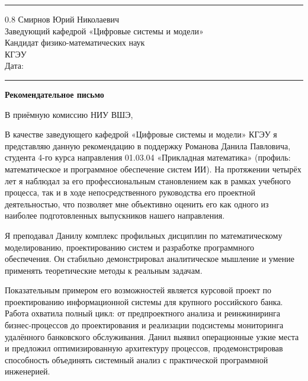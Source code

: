 \documentclass[a4paper,12pt]{article}
\begin{document}
\vspace{4pt}
\noindent\rule{\textwidth}{0.8pt}

\begin{flushright}
  \begin{spacing}{0.8}
    Смирнов Юрий Николаевич\\
    Заведующий кафедрой «Цифровые системы и модели»\\
    Кандидат физико-математических наук\\
    КГЭУ\\[6pt]
    Дата: \rule{4cm}{0.4pt}
  \end{spacing}
\end{flushright}

\begin{center}
  {\Large\bfseries Рекомендательное письмо}
\end{center}

В приёмную комиссию НИУ ВШЭ,

В качестве заведующего кафедрой «Цифровые системы и модели» КГЭУ я представляю данную рекомендацию в поддержку Романова Данила Павловича, студента 4-го курса направления 01.03.04 «Прикладная математика» (профиль: ма\-те\-ма\-ти\-че\-ское и про\-грамм\-ное обес\-пе\-че\-ние систем ИИ). На протяжении четырёх лет я наблюдал за его профессиональным становлением как в рамках учебного процесса, так и в ходе непосредственного руководства его проектной деятельностью, что позволяет мне объективно оценить его как одного из наиболее подготовленных выпускников нашего направления.

Я преподавал Данилу комплекс профильных дисциплин по математическому моделированию, проектированию систем и разработке программного обеспечения. Он стабильно демонстрировал аналитическое мышление и умение применять теоретические методы к реальным задачам.

Показательным примером его возможностей является курсовой проект по проектированию информационной системы для крупного российского банка. Работа охватила полный цикл: от предпроектного анализа и реинжиниринга бизнес-процессов до проектирования и реализации подсистемы мониторинга удалённого банковского обслуживания. Данил выявил операционные узкие места и предложил оптимизированную архитектуру процессов, продемонстрировав способность объединять системный анализ с практической программной инженерией.
\end{document}
